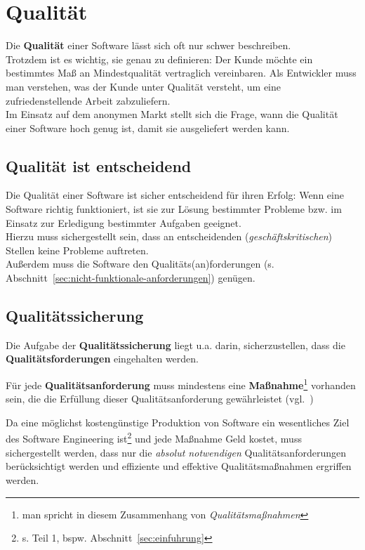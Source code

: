 \section{Qualität}
Die \textbf{Qualität} einer Software lässt sich oft nur schwer beschreiben.\\
Trotzdem ist es wichtig, sie genau zu definieren: Der Kunde möchte ein bestimmtes Maß an Mindestqualität vertraglich vereinbaren.
Als Entwickler muss man verstehen, was der Kunde unter Qualität versteht, um eine zufriedenstellende Arbeit zabzuliefern.\\
Im Einsatz auf dem anonymen Markt stellt sich die Frage, wann die Qualität einer Software hoch genug ist, damit sie ausgeliefert werden kann.

\subsection*{Qualität ist entscheidend}
Die Qualität einer Software ist sicher entscheidend für ihren Erfolg: Wenn eine Software richtig funktioniert, ist sie zur Lösung bestimmter Probleme bzw. im Einsatz zur Erledigung bestimmter Aufgaben geeignet.\\
Hierzu muss sichergestellt sein, dass an entscheidenden (\textit{geschäftskritischen}) Stellen keine Probleme auftreten.\\
Außerdem muss die Software den Qualitäts(an)forderungen (s. Abschnitt~\ref{sec:nicht-funktionale-anforderungen}) genügen.

\subsection*{Qualitätssicherung}
Die Aufgabe der \textbf{Qualitätssicherung} liegt u.a. darin, sicherzustellen, dass die \textbf{Qualitätsforderungen} eingehalten werden.

\vspace{2mm}
\begin{tcolorbox}
    Für jede \textbf{Qualitätsanforderung} muss mindestens eine \textbf{Maßnahme}\footnote{man spricht in diesem Zusammenhang von \textit{Qualitätsmaßnahmen}} vorhanden sein, die die Erfüllung dieser Qualitätsanforderung gewährleistet (vgl.~\cite[1]{Wed09c})
\end{tcolorbox}
\vspace{2mm}

\noindent
Da eine möglichst kostengünstige Produktion von Software ein wesentliches Ziel des Software Engineering ist\footnote{
s. Teil 1, bspw. Abschnitt~\ref{sec:einfuhrung}
} und jede Maßnahme Geld kostet, muss sichergestellt werden, dass nur die \textit{absolut notwendigen} Qualitätsanforderungen berücksichtigt werden und effiziente und effektive Qualitätsmaßnahmen ergriffen werden.

